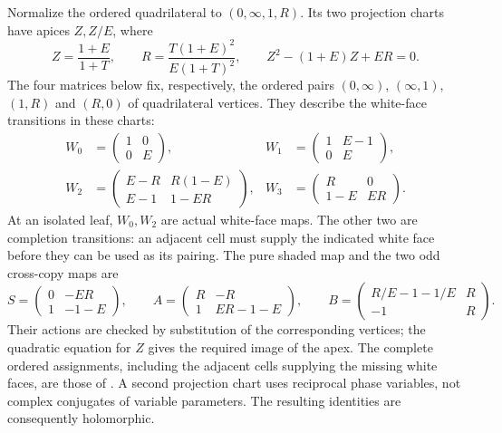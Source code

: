 Normalize the ordered quadrilateral to \((0,\infty,1,R)\). Its two
projection charts have apices \(Z,Z/E\), where
\[
 Z=\frac{1+E}{1+T},\qquad
 R=\frac{T(1+E)^2}{E(1+T)^2},\qquad
 Z^2-(1+E)Z+ER=0.
\]
The four matrices below fix, respectively, the ordered pairs
$(0,\infty)$, $(\infty,1)$, $(1,R)$ and $(R,0)$ of quadrilateral
vertices. They describe the white-face transitions in these charts:
\begin{equation}\label{eq:app-white-matrices}
\begin{aligned}
 W_0&=\begin{pmatrix}1&0\\0&E\end{pmatrix},&
 W_1&=\begin{pmatrix}1&E-1\\0&E\end{pmatrix},\\
 W_2&=\begin{pmatrix}E-R&R(1-E)\\E-1&1-ER\end{pmatrix},&
 W_3&=\begin{pmatrix}R&0\\1-E&ER\end{pmatrix}.
\end{aligned}
\end{equation}
At an isolated leaf, \(W_0,W_2\) are actual white-face maps.
The other two are completion transitions: an adjacent cell must supply
the indicated white face before they can be used as its pairing.
The pure shaded map and the two odd cross-copy maps are
\[
 S=\begin{pmatrix}0&-ER\\1&-1-E\end{pmatrix},\qquad
 A=\begin{pmatrix}R&-R\\1&ER-1-E\end{pmatrix},\qquad
 B=\begin{pmatrix}R/E-1-1/E&R\\-1&R\end{pmatrix}.
\]
Their actions are checked by substitution of the corresponding
vertices; the quadratic equation for $Z$ gives the required image of
the apex. The complete ordered assignments, including the adjacent
cells supplying the missing white faces, are those of
\cite[Sections 7--8]{StrictGeometry}. A second projection chart uses
reciprocal phase variables, not complex conjugates of variable
parameters. The resulting identities are consequently holomorphic.

